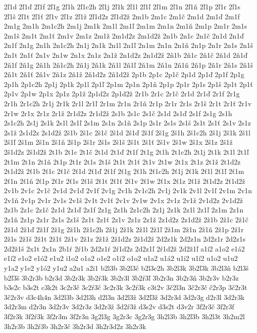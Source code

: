 {2ľ1d
2ľ1ď
2ľ1f
2ľ1g
2ľ1h
2ľ1c2h
2ľ1j
2ľ1k
2ľ1l
2ľ1ľ
2ľ1m
2ľ1n
2ľ1ň
2ľ1p
2ľ1r
2ľ1s
2ľ1š
2ľ1t
2ľ1ť
2ľ1v
2ľ1z
2ľ1ž
2ľ1d2z
2ľ1d2ž
2m1b
2m1c
2m1č
2m1d
2m1ď
2m1f
2m1g
2m1h
2m1c2h
2m1j
2m1k
2m1l
2m1ľ
2m1m
2m1n
2m1ň
2m1p
2m1r
2m1s
2m1š
2m1t
2m1ť
2m1v
2m1z
2m1ž
2m1d2z
2m1d2ž
2n1b
2n1c
2n1č
2n1d
2n1ď
2n1f
2n1g
2n1h
2n1c2h
2n1j
2n1k
2n1l
2n1ľ
2n1m
2n1n
2n1ň
2n1p
2n1r
2n1s
2n1š
2n1t
2n1ť
2n1v
2n1w
2n1x
2n1z
2n1ž
2n1d2z
2n1d2ž
2ň1b
2ň1c
2ň1č
2ň1d
2ň1ď
2ň1f
2ň1g
2ň1h
2ň1c2h
2ň1j
2ň1k
2ň1l
2ň1ľ
2ň1m
2ň1n
2ň1ň
2ň1p
2ň1r
2ň1s
2ň1š
2ň1t
2ň1ť
2ň1v
2ň1z
2ň1ž
2ň1d2z
2ň1d2ž
2p1b
2p1c
2p1č
2p1d
2p1ď
2p1f
2p1g
2p1h
2p1c2h
2p1j
2p1k
2p1l
2p1ľ
2p1m
2p1n
2p1ň
2p1p
2p1r
2p1s
2p1š
2p1t
2p1ť
2p1v
2p1w
2p1x
2p1z
2p1ž
2p1d2z
2p1d2ž
2r1b
2r1c
2r1č
2r1d
2r1ď
2r1f
2r1g
2r1h
2r1c2h
2r1j
2r1k
2r1l
2r1ľ
2r1m
2r1n
2r1ň
2r1p
2r1r
2r1s
2r1š
2r1t
2r1ť
2r1v
2r1w
2r1x
2r1z
2r1ž
2r1d2z
2r1d2ž
2s1b
2s1c
2s1č
2s1d
2s1ď
2s1f
2s1g
2s1h
2s1c2h
2s1j
2s1k
2s1l
2s1ľ
2s1m
2s1n
2s1ň
2s1p
2s1r
2s1s
2s1š
2s1t
2s1ť
2s1v
2s1z
2s1ž
2s1d2z
2s1d2ž
2š1b
2š1c
2š1č
2š1d
2š1ď
2š1f
2š1g
2š1h
2š1c2h
2š1j
2š1k
2š1l
2š1ľ
2š1m
2š1n
2š1ň
2š1p
2š1r
2š1s
2š1š
2š1t
2š1ť
2š1v
2š1w
2š1x
2š1z
2š1ž
2š1d2z
2š1d2ž
2t1b
2t1c
2t1č
2t1d
2t1ď
2t1f
2t1g
2t1h
2t1c2h
2t1j
2t1k
2t1l
2t1ľ
2t1m
2t1n
2t1ň
2t1p
2t1r
2t1s
2t1š
2t1t
2t1ť
2t1v
2t1w
2t1x
2t1z
2t1ž
2t1d2z
2t1d2ž
2ť1b
2ť1c
2ť1č
2ť1d
2ť1ď
2ť1f
2ť1g
2ť1h
2ť1c2h
2ť1j
2ť1k
2ť1l
2ť1ľ
2ť1m
2ť1n
2ť1ň
2ť1p
2ť1r
2ť1s
2ť1š
2ť1t
2ť1ť
2ť1v
2ť1w
2ť1x
2ť1z
2ť1ž
2ť1d2z
2ť1d2ž
2v1b
2v1c
2v1č
2v1d
2v1ď
2v1f
2v1g
2v1h
2v1c2h
2v1j
2v1k
2v1l
2v1ľ
2v1m
2v1n
2v1ň
2v1p
2v1r
2v1s
2v1š
2v1t
2v1ť
2v1v
2v1w
2v1x
2v1z
2v1ž
2v1d2z
2v1d2ž
2z1b
2z1c
2z1č
2z1d
2z1ď
2z1f
2z1g
2z1h
2z1c2h
2z1j
2z1k
2z1l
2z1ľ
2z1m
2z1n
2z1ň
2z1p
2z1r
2z1s
2z1š
2z1t
2z1ť
2z1v
2z1z
2z1ž
2z1d2z
2z1d2ž
2ž1b
2ž1c
2ž1č
2ž1d
2ž1ď
2ž1f
2ž1g
2ž1h
2ž1c2h
2ž1j
2ž1k
2ž1l
2ž1ľ
2ž1m
2ž1n
2ž1ň
2ž1p
2ž1r
2ž1s
2ž1š
2ž1t
2ž1ť
2ž1v
2ž1z
2ž1ž
2ž1d2z
2ž1d2ž
2d2z1k
2d2z1n
2d2z1r
2d2z1s
2d2ž1š
2x1t
2x1n
2b1ŕ
2ŕ1b
2d2z1ŕ
2ŕ1d2z
2d2z1ľ
2ŕ1d2ž
2d2ž1ľ
a1í2
a1o2
e1á2
e1í2
e1o2
e1ó2
e1u2
i1o2
o1a2
o1e2
o1i2
o1o2
u1a2
u1á2
u1i2
u1í2
u1o2
u1u2
y1a2
y1e2
y1ó2
y1u2
a2u1
a2i1
b2l3b
3b2l3č
b2l3c2h
3b2l3k
3b2ľ3k
3b2l3ň
b2l3š
b2ľ3š
3b2r3b
b2r3d
3b2r3k
3b2ŕ3k
3b2r3l
3b2ŕ3ľ
3b2r3n
3b2r3ň
3b2r3v
b2r3z
b3s2c
b3s2t
c3k2t
3c2r3č
3c2ŕ3č
3c2r3k
3c2ŕ3k
c3t2v
3č2l3n
3č2r3č
č2r3p
3č2r3t
3č2r3v
d3c4h4n
3d2l3b
3d2l3h
d2l3n
3d2l3ž
3d2ľ3ž
3d2r3d
3d2r3g
d2r3l
3d2r3k
3d2r3m
d2r3n
3d2r3v
3d2r3z
3d2r3ž
3d2ŕ3ž
d3s2v
d3s2t
d3v2r
3f2r3č
3f2r3f
3f2r3k
3f2ŕ3k
3f2r3m
3f2r3n
3g2l3g
3g2r3c
3g2r3g
3h2l3b
3h2ľ3b
3h2l3t
3h2m2l
3h2r3b
3h2ŕ3b
3h2r3č
3h2r3d
3h2r3d2z
3h2r3k
}
